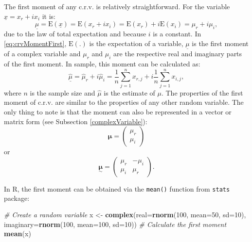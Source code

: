 \documentclass[
]{book}
\newenvironment{Shaded}{\begin{snugshade}}{\end{snugshade}}
\newcommand{\CommentTok}[1]{\textcolor[rgb]{0.56,0.35,0.01}{\textit{#1}}}
\newcommand{\DataTypeTok}[1]{\textcolor[rgb]{0.13,0.29,0.53}{#1}}
\newcommand{\DecValTok}[1]{\textcolor[rgb]{0.00,0.00,0.81}{#1}}
\newcommand{\KeywordTok}[1]{\textcolor[rgb]{0.13,0.29,0.53}{\textbf{#1}}}
\newcommand{\NormalTok}[1]{#1}
\newcommand{\StringTok}[1]{\textcolor[rgb]{0.31,0.60,0.02}{#1}}
\begin{document}
The first moment of any c.r.v. is relatively straightforward. For the variable \(\underline{x}=x_r+ix_i\) it is:
\begin{equation}
    \underline{\mu} = \mathrm{E}(\underline{x}) = \mathrm{E}(x_r + i x_i) = \mathrm{E}(x_r) + i \mathrm{E}(x_i) = \mu_{r} + i \mu_{i},
    \label{eq:crvMomentFirst}
\end{equation}
due to the law of total expectation and because \(i\) is a constant. In \eqref{eq:crvMomentFirst}, \(\mathrm{E}(.)\) is the expectation of a variable, \(\underline{\mu}\) is the first moment of a complex variable and \(\mu_{r}\) and \(\mu_{i}\) are the respective real and imaginary parts of the first moment. In sample, this moment can be calculated as:
\begin{equation}
    \underline{\hat{\mu}} = \hat{\mu}_{r} + i \hat{\mu}_{i} = \frac{1}{n}\sum_{j=1}^n x_{r,j} + i \frac{1}{n}\sum_{j=1}^n x_{i,j},
    \label{eq:crvMomentFirstSample}
\end{equation}
where \(n\) is the sample size and \(\hat{\mu}\) is the estimate of \(\mu\). The properties of the first moment of c.r.v. are similar to the properties of any other random variable. The only thing to note is that the moment can also be represented in a vector or matrix form (see Subsection \ref{complexVariable}):
\begin{equation}
    \boldsymbol{\mu} = \begin{pmatrix} \mu_{r} \\ \mu_{i} \end{pmatrix} 
    \label{eq:crvMomentsVector}
\end{equation}
or
\begin{equation}
    \underset{\sim}{\boldsymbol{\mu}} = \begin{pmatrix} \mu_{r} & - \mu_{i} \\ \mu_{i} & \mu_{r} \end{pmatrix} .
    \label{eq:crvMomentsMatrix}
\end{equation}

In R, the first moment can be obtained via the \texttt{mean()} function from \texttt{stats} package:

\begin{Shaded}
\begin{Highlighting}[]
\CommentTok{\# Create a random variable}
\NormalTok{x \textless{}{-}}\StringTok{ }\KeywordTok{complex}\NormalTok{(}\DataTypeTok{real=}\KeywordTok{rnorm}\NormalTok{(}\DecValTok{100}\NormalTok{, }\DataTypeTok{mean=}\DecValTok{50}\NormalTok{, }\DataTypeTok{sd=}\DecValTok{10}\NormalTok{),}
             \DataTypeTok{imaginary=}\KeywordTok{rnorm}\NormalTok{(}\DecValTok{100}\NormalTok{, }\DataTypeTok{mean=}\DecValTok{100}\NormalTok{, }\DataTypeTok{sd=}\DecValTok{10}\NormalTok{))}
\CommentTok{\# Calculate the first moment}
\KeywordTok{mean}\NormalTok{(x)}
\end{Highlighting}
\end{Shaded}
\end{document}
